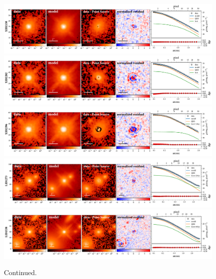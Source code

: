 \documentclass[apj]{emulateapj}
\begin{document}
\begin{figure}
\centering
{
\includegraphics[height=0.25\textwidth]{fig/best_fit_XID2138_SB_profile.pdf}
\includegraphics[height=0.25\textwidth]{fig/best_fit_XID2202_SB_profile.pdf}
\includegraphics[height=0.25\textwidth]{fig/best_fit_XID2396_SB_profile.pdf}
\includegraphics[height=0.25\textwidth]{fig/best_fit_LID1273_SB_profile.pdf}
\includegraphics[height=0.25\textwidth]{fig/best_fit_LID1538_SB_profile.pdf}
}
\caption{Continued.}
\end{figure} 
\end{document}
